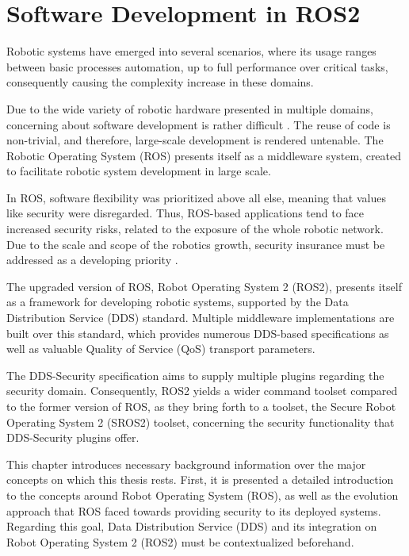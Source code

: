 \chapter{Software Development in ROS2}\label{c:ros}

Robotic systems have emerged into several scenarios, where its usage ranges between basic processes automation, up to full performance over critical tasks, consequently causing the complexity increase in these domains. 

Due to the wide variety of robotic hardware presented in multiple domains, concerning about software development is rather difficult \cite{cousins2011exponential}. The reuse of code is non-trivial, and therefore, large-scale development is rendered untenable. The Robotic Operating System (ROS) presents itself as a middleware system, created to facilitate robotic system development in large scale.

In ROS, software flexibility was prioritized above all else, meaning that values like security were disregarded. Thus, ROS-based applications tend to face increased security risks, related to the exposure of the whole robotic network. Due to the scale and scope of the robotics growth, security insurance must be addressed as a developing priority \cite{diluoffo2018robot, kim2018security}.

The upgraded version of ROS, Robot Operating System 2 (ROS2), presents itself as a framework for developing robotic systems, supported by the Data Distribution Service (DDS) standard. Multiple middleware implementations are built over this standard, which provides numerous DDS-based specifications as well as valuable Quality of Service (QoS) transport parameters.

The DDS-Security specification \cite{dds-s} aims to supply multiple plugins regarding the security domain. Consequently, ROS2 yields a wider command toolset compared to the former version of ROS, as they bring forth to a toolset, the Secure Robot Operating System 2 (SROS2) toolset, concerning the security functionality that DDS-Security plugins offer.

This chapter introduces necessary background information over the major concepts on which this thesis rests. First, it is presented a detailed introduction to the concepts around Robot Operating System (ROS), as well as the evolution approach that ROS faced towards providing security to its deployed systems. Regarding this goal, Data Distribution Service (DDS) and its integration on Robot Operating System 2 (ROS2) must be contextualized beforehand.


